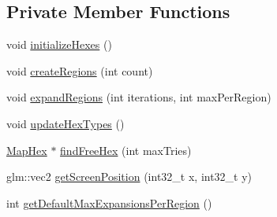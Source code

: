 \subsection*{Private Member Functions}
\begin{DoxyCompactItemize}
\item 
void \hyperlink{class_game_map_ad0de88300a253f8a9ec7dc784b2bf950}{initialize\+Hexes} ()
\item 
void \hyperlink{class_game_map_a9247f8700b645bc62c574811cce82bf7}{create\+Regions} (int count)
\item 
void \hyperlink{class_game_map_a1dd3adda9c0f19a20dc6df3786746868}{expand\+Regions} (int iterations, int max\+Per\+Region)
\item 
void \hyperlink{class_game_map_a2671aab9bbbdb130b33d8b3aa0bb0d87}{update\+Hex\+Types} ()
\item 
\hyperlink{class_map_hex}{Map\+Hex} $\ast$ \hyperlink{class_game_map_a701f80838169a259bdbb9a157a1bb85d}{find\+Free\+Hex} (int max\+Tries)
\item 
glm\+::vec2 \hyperlink{class_game_map_a0b997749d8585a6b4173a1d3f174949c}{get\+Screen\+Position} (int32\+\_\+t x, int32\+\_\+t y)
\item 
int \hyperlink{class_game_map_ac1839b6598d61f7349dcb26f25044a95}{get\+Default\+Max\+Expansions\+Per\+Region} ()
\end{DoxyCompactItemize}
